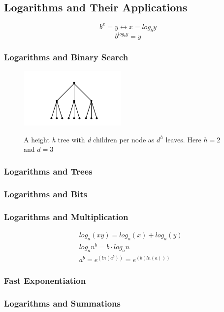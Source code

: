 \subsection{Logarithms and Their Applications}
$$b^{x} = y \leftrightarrow x = log_{b}y$$
$$b^{log_{b}y} = y$$

\subsubsection{Logarithms and Binary Search}

\begin{figure}[H]
  \centering
     \includegraphics[scale=0.9]{./2_7.png}
  \label{fig:demo-diagram2-4}
  \caption{ A height \emph{h} tree with \emph{d} children per node as \emph{$d^{h}$} leaves. Here $h=2$ and $d=3$}
\end{figure}


\subsubsection{Logarithms and Trees}

\subsubsection{Logarithms and Bits}

\subsubsection{Logarithms and Multiplication}

\begin{align*}
	&log_{a}(xy) = log_{a}(x) + log_a(y) \\
	&log_{a} n^{b} = b \cdot log_{a} n \\
	&a^{b} = e^{(ln(a^{b}))} = e^{(b(ln(a)))}
\end{align*}

\subsubsection{Fast Exponentiation}

\subsubsection{Logarithms and Summations}

